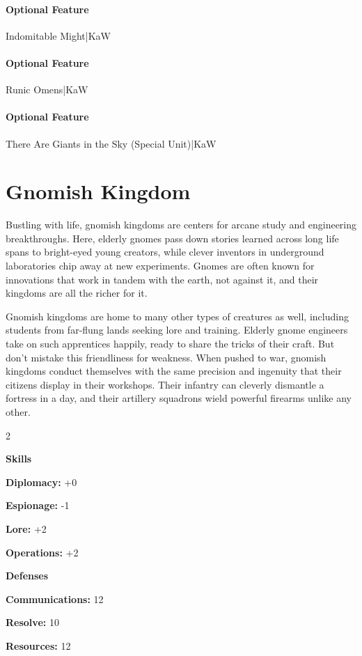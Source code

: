 \documentclass[10pt,a4paper,twoside,bg=print,twocolumn,openany,nodeprecatedcode]{dndbook}
\begin{document}
\paragraph{Optional Feature}
Indomitable Might|KaW

\paragraph{Optional Feature}
Runic Omens|KaW

\paragraph{Optional Feature}
There Are Giants in the Sky (Special Unit)|KaW

\section{Gnomish Kingdom}
Bustling with life, gnomish kingdoms are centers for arcane study and engineering breakthroughs. Here, elderly gnomes pass down stories learned across long life spans to bright-eyed young creators, while clever inventors in underground laboratories chip away at new experiments. Gnomes are often known for innovations that work in tandem with the earth, not against it, and their kingdoms are all the richer for it.

Gnomish kingdoms are home to many other types of creatures as well, including students from far-flung lands seeking lore and training. Elderly gnome engineers take on such apprentices happily, ready to share the tricks of their craft. But don't mistake this friendliness for weakness. When pushed to war, gnomish kingdoms conduct themselves with the same precision and ingenuity that their citizens display in their workshops. Their infantry can cleverly dismantle a fortress in a day, and their artillery squadrons wield powerful firearms unlike any other.


\begin{itemize}
\begin{multicols}{2}
\item \textbf{Skills}
\item \textbf{Diplomacy:} +0
\item \textbf{Espionage:} -1
\item \textbf{Lore:} +2
\item \textbf{Operations:} +2
\item \textbf{Defenses}
\item \textbf{Communications:} 12
\item \textbf{Resolve:} 10
\item \textbf{Resources:} 12
\end{multicols}

\end{itemize}
\end{document}
